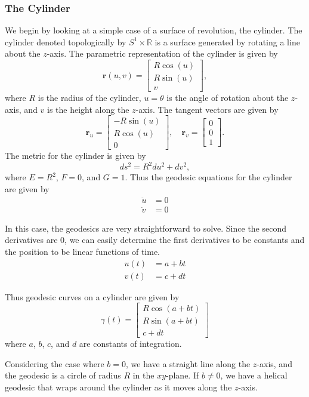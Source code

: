 \documentclass[12pt]{article}
\begin{document}
\subsubsection{The Cylinder}
We begin by looking at a simple case of a surface of revolution, the cylinder.
The cylinder denoted topologically by \(S^1 \times \mathbb{R}\) is a surface generated by rotating a line about the \(z\)-axis.
The parametric representation of the cylinder is given by
\[
	\mathbf{r}(u, v) = \begin{bmatrix} R \cos (u) \\ R \sin (u) \\ v \end{bmatrix},
\]
where \(R\) is the radius of the cylinder, \(u = \theta\) is the angle of rotation about the \(z\)-axis, and \(v\) is the height along the \(z\)-axis.
The tangent vectors are given by
\[
	\mathbf{r}_u = \begin{bmatrix} -R \sin (u) \\ R \cos (u) \\ 0 \end{bmatrix}, \quad \mathbf{r}_v = \begin{bmatrix} 0 \\ 0 \\ 1 \end{bmatrix}.
\]
The metric for the cylinder is given by
\[
	ds^2 = R^2 du^2 + dv^2,
\]
where \(E = R^2\), \(F = 0\), and \(G = 1\).
Thus the geodesic equations for the cylinder are given by
\begin{align*}
	\ddot{u} &= 0 \\
	\ddot{v} &= 0
\end{align*}

In this case, the geodesics are very straightforward to solve.
Since the second derivatives are 0, we can easily determine the first derivatives to be constants and the position to be linear functions of time.
\begin{align*}
	u(t) &= a + b t \\
	v(t) &= c + d t
\end{align*}

Thus geodesic curves on a cylinder are given by 
\[
	\gamma(t) = \begin{bmatrix} R \cos (a + b t) \\ R \sin (a + b t) \\ c + d t \end{bmatrix}
\]
where \(a\), \(b\), \(c\), and \(d\) are constants of integration.

Considering the case where \(b = 0\), we have a straight line along the \(z\)-axis, and the geodesic is a circle of radius \(R\) in the \(xy\)-plane.
If \(b \neq 0\), we have a helical geodesic that wraps around the cylinder as it moves along the \(z\)-axis.
\end{document}

